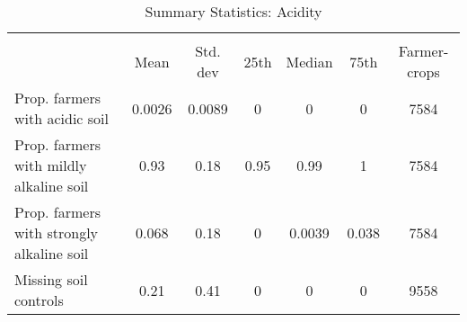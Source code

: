 \begin{table}[htbp]\centering
\def\sym#1{\ifmmode^{#1}\else\(^{#1}\)\fi}
\caption{Summary Statistics: Acidity\label{tab:sumstats}}
\begin{tabular}{l*{1}{cccccc}}
\toprule
                    &\multicolumn{6}{c}{}                                                         \\
                    &        Mean&    Std. dev&        25th&      Median&        75th&Farmer-crops\\
\midrule
Prop. farmers with acidic soil&      0.0026&      0.0089&           0&           0&           0&        7584\\
Prop. farmers with mildly alkaline soil&        0.93&        0.18&        0.95&        0.99&           1&        7584\\
Prop. farmers with strongly alkaline soil&       0.068&        0.18&           0&      0.0039&       0.038&        7584\\
Missing soil controls&        0.21&        0.41&           0&           0&           0&        9558\\
\bottomrule
\end{tabular}
\end{table}
